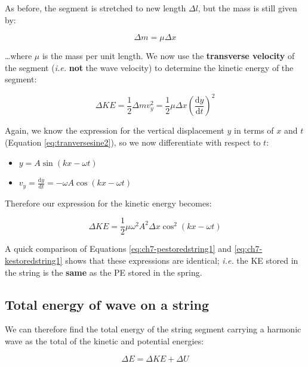 \documentclass[
]{book}
\providecommand{\tightlist}{%
  \setlength{\itemsep}{0pt}\setlength{\parskip}{0pt}}
\begin{document}
As before, the segment is stretched to new length \(\Delta l\), but the mass is still given by:

\begin{equation}
\Delta m = \mu \Delta x
\end{equation}

\ldots where \(\mu\) is the mass per unit length. We now use the \textbf{transverse velocity} of the segment (\emph{i.e.} \textbf{not} the wave velocity) to determine the kinetic energy of the segment:

\begin{equation}
\Delta KE = \frac{1}{2} \Delta m v_y^2 = \frac{1}{2} \mu \Delta x \left( \frac{\mathrm{d}y}{\mathrm{d}t} \right)^2
\end{equation}

Again, we know the expression for the vertical displacement \(y\) in terms of \(x\) and \(t\) (Equation \eqref{eq:tranversesine2}), so we now differentiate with respect to \(t\):

\begin{itemize}
\tightlist
\item
  \(y = A \sin(kx - \omega t)\)
\item
  \(v_y = \frac{\mathrm{d}y}{\mathrm{d}t} = -\omega A \cos(kx - \omega t)\)
\end{itemize}

Therefore our expression for the kinetic energy becomes:

\begin{equation}
\Delta KE =  \frac{1}{2} \mu \omega^2  A^2 \Delta x  \cos^2(kx - \omega t)
\label{eq:ch7-kestoredstring1}
\end{equation}

A quick comparison of Equations \eqref{eq:ch7-pestoredstring1} and \eqref{eq:ch7-kestoredstring1} shows that these expressions are identical; \emph{i.e.} the KE stored in the string is the \textbf{same} as the PE stored in the spring.

\hypertarget{sec:ch7-totenergystringsegment}{%
\subsection{Total energy of wave on a string}\label{sec:ch7-totenergystringsegment}}

We can therefore find the total energy of the string segment carrying a harmonic wave as the total of the kinetic and potential energies:

\begin{equation}
\Delta E = \Delta KE + \Delta U
\end{equation}
\end{document}
